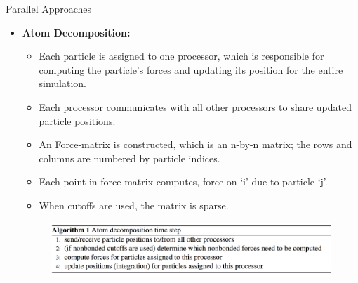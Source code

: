\documentclass[aspectratio=169]{beamer}
\begin{document}
\begin{frame}[fragile]{Parallel Approaches}


\begin{itemize}
\item \textbf{Atom Decomposition:}
\begin{itemize}
\item Each particle is assigned to one processor, which is responsible for computing the particle’s forces and updating its position for the entire simulation.
\item Each processor communicates with all other processors to share updated particle positions.
\item An Force-matrix is constructed, which is an n-by-n matrix; the rows and columns are numbered by particle indices. 
\item Each point in force-matrix computes, force on ‘i’ due to particle ‘j’.
\item When cutoffs are used, the matrix is sparse.
\end{itemize}
\begin{figure}
\includegraphics[scale=0.3]{Graphics/slide_6.png}
\end{figure}
\end{itemize}


\end{frame}
\end{document}
